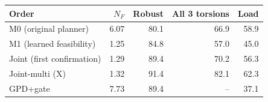 \begin{tabular}{lrrrr}
\toprule
Order & $N_F$ & Robust & All 3 torsions & Load \\
\midrule
M0 (original planner) & 6.07 & 80.1 & 66.9 & 58.9 \\
M1 (learned feasibility) & 1.25 & 84.8 & 57.0 & 45.0 \\
Joint (first confirmation) & 1.29 & 89.4 & 70.2 & 56.3 \\
Joint-multi (X) & 1.32 & 91.4 & 82.1 & 62.3 \\
GPD+gate & 7.73 & 89.4 & -- & 37.1 \\
\bottomrule
\end{tabular}
